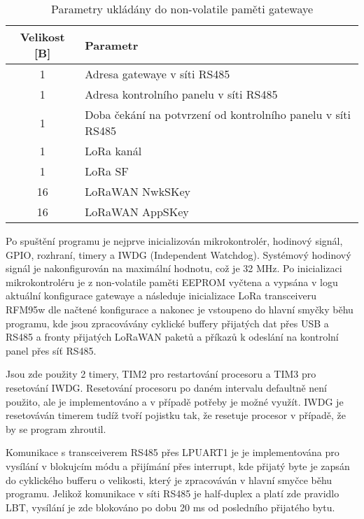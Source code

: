 \begin{longtable} { |c|p{7cm}| }
    \caption{Parametry ukládány do non-volatile paměti gatewaye} 
    \label{table:Parametry ukládány do non-volatile paměti gatewaye} \\
    \hline

    Velikost [B]          & Parametr           \\ \hline \hline
    1    & Adresa gatewaye v síti RS485       \\    \hline
    1    & Adresa kontrolního panelu v síti RS485       \\  \hline
    1    & Doba čekání na potvrzení od kontrolního panelu v síti RS485       \\ \hline
    1    & LoRa kanál       \\  \hline
    1    & LoRa SF       \\ \hline
    16    & LoRaWAN NwkSKey       \\ \hline
    16    & LoRaWAN AppSKey       \\ \hline
 
\end{longtable}

Po spuštění programu je nejprve inicializován mikrokontrolér, hodinový signál, GPIO, rozhraní, timery a IWDG (Independent Watchdog). Systémový hodinový signál je nakonfigurován na maximální hodnotu, což je 32 MHz. Po inicializaci mikrokontroléru je z non-volatile paměti EEPROM vyčtena a vypsána v logu aktuální konfigurace gatewaye a následuje inicializace LoRa transceiveru RFM95w dle načtené konfigurace a nakonec je vstoupeno do hlavní smyčky běhu programu, kde jsou zpracovávány cyklické buffery přijatých dat přes USB a RS485 a fronty přijatých LoRaWAN paketů a příkazů k odeslání na kontrolní panel přes síť RS485. 

Jsou zde použity 2 timery, TIM2 pro restartování procesoru a TIM3 pro resetování IWDG.
Resetování procesoru po daném intervalu defaultně není použito, ale je implementováno a v případě potřeby je možné využít. IWDG je resetováván timerem tudíž tvoří pojistku tak, že resetuje procesor v případě, že by se program zhroutil.

Komunikace s transceiverem RS485 přes LPUART1 je je implementována pro vysílání v blokujcím módu a přijímání přes interrupt, kde přijatý byte je zapsán do cyklického bufferu o velikosti, který je zpracováván v hlavní smyčce běhu programu. 
Jelikož komunikace v síti RS485 je half-duplex a platí zde pravidlo LBT, vysílání je zde blokováno po dobu 20 ms od posledního přijatého bytu.

